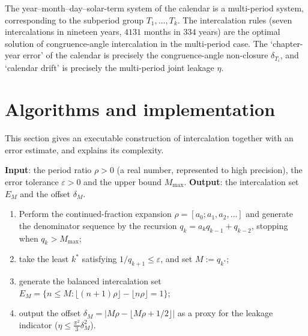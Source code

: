 \begin{remark}\label{rem:interface_calendar_congruence}
The year--month--day--solar-term system of the calendar is a multi-period system, corresponding to the subperiod group $T_1,\dots,T_k$. The intercalation rules (seven intercalations in nineteen years, $4131$ months in $334$ years) are the optimal solution of congruence-angle intercalation in the multi-period case. The `chapter-year error' of the calendar is precisely the congruence-angle non-closure $\delta_{T_i}$, and `calendar drift' is precisely the multi-period joint leakage $\eta$.
\end{remark}

\section{Algorithms and implementation}\label{sec:intercalation_algorithms}

This section gives an executable construction of intercalation together with an error estimate, and explains its complexity.

\begin{definition}\label{def:intercalation_window_algorithm}
\textbf{Input}: the period ratio $\rho>0$ (a real number, represented to high precision), the error tolerance $\varepsilon>0$ and the upper bound $M_{\max}$. \textbf{Output}: the intercalation set $E_M$ and the offset $\delta_M$.
\begin{enumerate}[label=\textbf{Step \arabic*.}]
    \item Perform the continued-fraction expansion $\rho=[a_0;a_1,a_2,\dots]$ and generate the denominator sequence by the recursion $q_k=a_kq_{k-1}+q_{k-2}$, stopping when $q_k>M_{\max}$;
    \item take the least $k^\ast$ satisfying $1/q_{k+1}\le\varepsilon$, and set $M:=q_{k^\ast}$;
    \item generate the balanced intercalation set $E_M=\{n\le M:\lfloor(n+1)\rho\rfloor-\lfloor n\rho\rfloor=1\}$;
    \item output the offset $\delta_M=|M\rho-\lfloor M\rho+1/2\rfloor|$ as a proxy for the leakage indicator ($\eta\le\frac{\pi^2}{3}\delta_M^2$).
\end{enumerate}
\end{definition}


